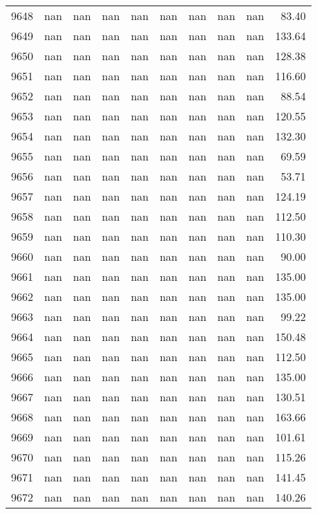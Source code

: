 \begin{tabular}{lrrrrrrrrr}
9648 & nan & nan & nan & nan & nan & nan & nan & nan & 83.40 \\
9649 & nan & nan & nan & nan & nan & nan & nan & nan & 133.64 \\
9650 & nan & nan & nan & nan & nan & nan & nan & nan & 128.38 \\
9651 & nan & nan & nan & nan & nan & nan & nan & nan & 116.60 \\
9652 & nan & nan & nan & nan & nan & nan & nan & nan & 88.54 \\
9653 & nan & nan & nan & nan & nan & nan & nan & nan & 120.55 \\
9654 & nan & nan & nan & nan & nan & nan & nan & nan & 132.30 \\
9655 & nan & nan & nan & nan & nan & nan & nan & nan & 69.59 \\
9656 & nan & nan & nan & nan & nan & nan & nan & nan & 53.71 \\
9657 & nan & nan & nan & nan & nan & nan & nan & nan & 124.19 \\
9658 & nan & nan & nan & nan & nan & nan & nan & nan & 112.50 \\
9659 & nan & nan & nan & nan & nan & nan & nan & nan & 110.30 \\
9660 & nan & nan & nan & nan & nan & nan & nan & nan & 90.00 \\
9661 & nan & nan & nan & nan & nan & nan & nan & nan & 135.00 \\
9662 & nan & nan & nan & nan & nan & nan & nan & nan & 135.00 \\
9663 & nan & nan & nan & nan & nan & nan & nan & nan & 99.22 \\
9664 & nan & nan & nan & nan & nan & nan & nan & nan & 150.48 \\
9665 & nan & nan & nan & nan & nan & nan & nan & nan & 112.50 \\
9666 & nan & nan & nan & nan & nan & nan & nan & nan & 135.00 \\
9667 & nan & nan & nan & nan & nan & nan & nan & nan & 130.51 \\
9668 & nan & nan & nan & nan & nan & nan & nan & nan & 163.66 \\
9669 & nan & nan & nan & nan & nan & nan & nan & nan & 101.61 \\
9670 & nan & nan & nan & nan & nan & nan & nan & nan & 115.26 \\
9671 & nan & nan & nan & nan & nan & nan & nan & nan & 141.45 \\
9672 & nan & nan & nan & nan & nan & nan & nan & nan & 140.26 \\

\end{tabular}
